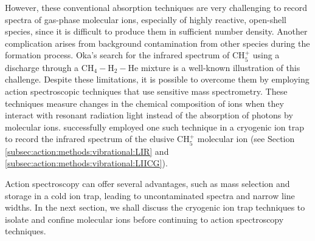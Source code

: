 However, these conventional absorption techniques are very challenging to
record spectra of gas-phase molecular ions, especially of highly reactive,
open-shell species, since it is difficult to produce them in sufficient
number density. Another complication arises from background contamination from
other species during the formation process. Oka's \cite{oka_taming_2015} search
for the infrared spectrum of CH$_5^+$ using a discharge through a
CH$_4-$H$_2-$He mixture is a well-known illustration of this challenge.
Despite these limitations, it is possible to overcome them by employing action spectroscopic 
techniques that use sensitive mass spectrometry.
These techniques measure changes in the chemical composition of ions when they interact with resonant radiation 
light instead of the absorption of photons by molecular ions.
\citet{asvany_understanding_2005} successfully employed one such technique in a
cryogenic ion trap to record the infrared spectrum of the elusive CH$_5^+$
molecular ion (see Section \ref{subsec:action:methods:vibrational:LIR} and
\ref{subsec:action:methods:vibrational:LIICG}).

Action spectroscopy can offer several advantages, such as mass selection and
storage in a cold ion trap, leading to uncontaminated spectra and narrow line
widths. In the next section, we shall discuss the cryogenic ion trap techniques
to isolate and confine molecular ions before continuing to action spectroscopy
techniques.